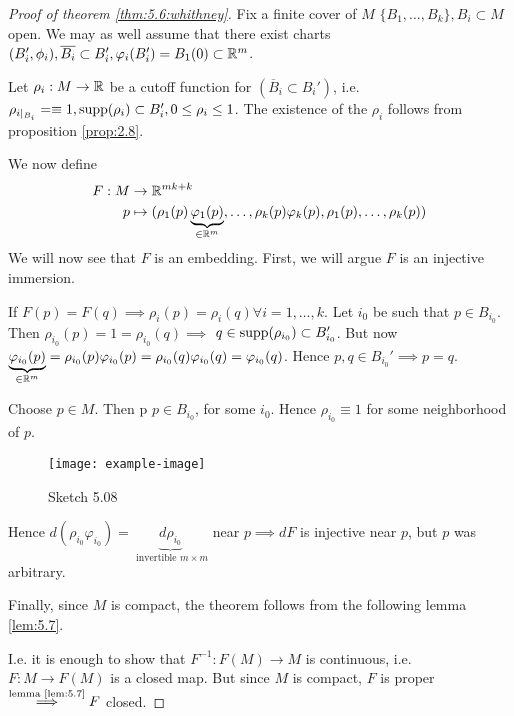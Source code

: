 \begin{proof}[Proof of theorem \ref{thm:5.6:whithney}]
    Fix a finite cover of \(M\) \(\{B_1,\dots,B_k\},B_i\subset M\) open. We may as well assume 
    that there exist charts \((B_i',\phi_i),\overline{B_i}\subset B_i',\varphi_i(B_i')=B_1(0)\subset \mathbb{R}^m\).

    Let \(\rho_i:M\to \mathbb{R}\) be a cutoff function for \((\overline{B}_i\subset B_i')\), i.e. \(\rho_{i\mid_{B_i}}=\equiv 1,\text{supp} (\rho_i)\subset B_i',0\leq \rho_i\leq 1\).
    The existence of the \(\rho_i\) follows from proposition \ref{prop:2.8}. 

    We now define 
    \begin{align*}
        F:M&\to \mathbb{R}^{mk+k}\\
        p&\mapsto (\rho_1(p)\underbrace{\varphi_1(p)}_{\in \mathbb{R}^m},\dots,\rho_k(p)\varphi_k(p),\rho_1(p),\dots,\rho_k(p))
    \end{align*}
    We will now see that \(F\) is an embedding. First, we will argue \(F\) is an injective immersion.

    If \(F(p)=F(q)\implies \rho_i(p)=\rho_i(q)\forall i=1,\dots,k\). Let \(i_0\) be such that \(p\in B_{i_0}\). Then 
    \(\rho_{i_0}(p)=1=\rho_{i_0}(q)\implies\) \(q\in \text{supp}(\rho_{i_0})\subset B_{i_0}'\). But 
    now \(\underbrace{\varphi_{i_0}(p)}_{\in\mathbb{R}^m} = \rho_{i_0}(p)\varphi_{i_0}(p)=\rho_{i_0}(q)\varphi_{i_0}(q)=\varphi_{i_0}(q)\). Hence \(p,q\in B_{i_0}'\implies p=q\).

     Choose \(p\in M\). Then p \(p\in B_{i_0}\), for some 
    \(i_0\). Hence \(\rho_{i_0}\equiv 1\) for some neighborhood of \(p\).
    \begin{figure}[H]
        \centering
        \texttt{[image: example-image]}
        \caption{Sketch 5.08}
    \end{figure}
    Hence \(d(\rho_{i_0}\varphi_{i_0})=\underbrace{d\rho_{i_0}}_{\text{ invertible }m\times m}\) near \(p\implies dF\) is injective near \(p\), but \(p\) was arbitrary.

    Finally,
    since \(M\) is compact, the theorem follows from the following lemma \ref{lem:5.7}.

    I.e. it is enough to show that \(F^{-1}:F(M)\to M\) is continuous, i.e. 
    \(F:M\to F(M)\) is a closed map. But since \(M\) is compact, \(F\) is proper \(\stackrel{\text{lemma \ref{lem:5.7}}}{\implies} F\) closed.

\end{proof}


